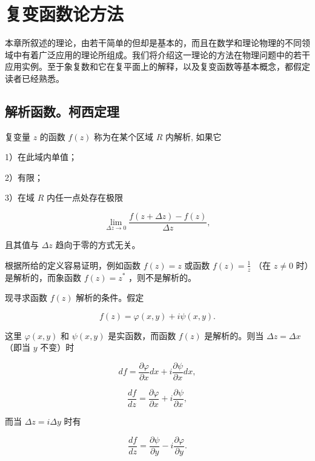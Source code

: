 \chapter{复变函数论方法}

本章所叙述的理论，由若干简单的但却是基本的，而且在数学和理论物理的不同领域中有着广泛应用的理论所组成。我们将介绍这一理论的方法在物理问题中的若干应用实例。至于象复数和它在复平面上的解释，以及复变函数等基本概念，都假定读者已经熟悉。

\section{解析函数。柯西定理}

复变量 $z$ 的函数 $f(z)$ 称为在某个区域 $R$ 内解析, 如果它

1）在此域内单值；

2）有限；

3）在域 $R$ 内任一点处存在极限

\begin{equation*}
\lim _ {\Delta z \rightarrow 0} \frac {f (z + \Delta z) - f (z)}{\Delta z},
\end{equation*}

且其值与 $\Delta z$ 趋向于零的方式无关。

根据所给的定义容易证明，例如函数 $f(z) = z$ 或函数 $f(z) = \frac{1}{z}$ （在 $z \neq 0$ 时）是解析的，而象函数 $f(z) = z^{*}$ ，则不是解析的。

现寻求函数 $f(z)$ 解析的条件。假定

\begin{equation*}
f (z) = \varphi (x, y) + i \psi (x, y).
\end{equation*}

这里 $\varphi(x, y)$ 和 $\psi(x, y)$ 是实函数，而函数 $f(z)$ 是解析的。则当 $\Delta z = \Delta x$ （即当 $y$ 不变）时

\begin{equation*}
d f = \frac {\partial \varphi}{\partial x} d x + i \frac {\partial \psi}{\partial x} d x,
\end{equation*}

\begin{equation*}
\frac {d f}{d z} = \frac {\partial \varphi}{\partial x} + i \frac {\partial \psi}{\partial x},
\end{equation*}

而当 $\Delta z = i\Delta y$ 时有

\begin{equation*}
\frac {d f}{d z} = \frac {\partial \psi}{\partial y} - i \frac {\partial \varphi}{\partial y}.
\end{equation*}

